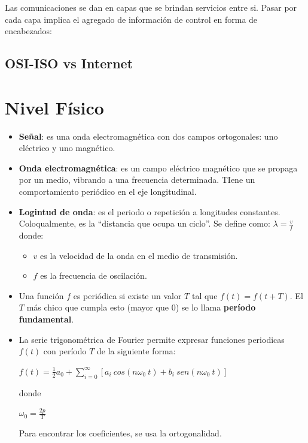 \documentclass[]{article}
\begin{document}
Las comunicaciones se dan en capas que se brindan servicios entre si. Pasar por cada capa implica el agregado de información de control en forma de encabezados:


\subsection{OSI-ISO vs Internet}


\section{Nivel Físico}
\begin{itemize}
    \item \textbf{Señal}: es una onda electromagnética con dos campos ortogonales: uno eléctrico y uno magnético.
    \item \textbf{Onda electromagnética}: es un campo eléctrico magnético que se propaga por un medio, vibrando a una frecuencia determinada. TIene un comportamiento periódico en el eje longitudinal.
    \item \textbf{Logintud de onda}: es el periodo o repetición a longitudes constantes. Coloqualmente, es la ``distancia que ocupa un ciclo''. Se define como: $\displaystyle \lambda = \frac{v}{f}$ donde:
    \begin{itemize}
        \item $v$ es la velocidad de la onda en el medio de transmisión.
        \item $f$ es la frecuencia de oscilación.
    \end{itemize}
    \item Una función $f$ es periódica si existe un valor $T$ tal que $f(t) = f(t + T)$. El $T$ más chico que cumpla esto (mayor que 0) se lo llama \textbf{período fundamental}.
    \item La serie trigonométrica de Fourier permite expresar funciones periodicas $f(t)$ con período $T$ de la siguiente forma:
    \begin{center}
        $f(t) = \displaystyle \frac{1}{2}a_0 + \sum_{i=0}^{\infty}[a_i\ cos(n\omega_0\ t) + b_i\ sen(n\omega_0\ t)]$
    \end{center}
    donde
    \begin{center}
        $\omega_0 = \displaystyle \frac{2p}{T}$
    \end{center}

    Para encontrar los coeficientes, se usa la ortogonalidad.
\end{itemize}
\end{document}
